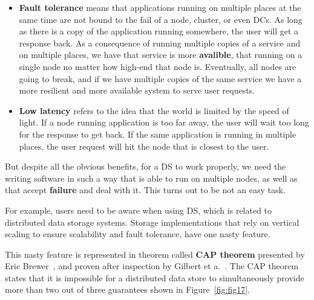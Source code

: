 \begin{itemize}
	\item \textbf{Fault tolerance} means that applications running on multiple places at the same time are not bound to the fail of a node, cluster, or even DCs. As long as there is a copy of the application running somewhere, the user will get a response back. As a consequence of running multiple copies of a service and on multiple places, we have that service is more \textbf{avalible}, that running on a single node no matter how high-end that node is. Eventually, all nodes are going to break, and if we have multiple copies of the same service we have a more resilient and more available system to serve user requests.
	\item \textbf{Low latency} refers to the idea that the world is limited by the speed of light. If a node running application is too far away, the user will wait too long for the response to get back. If the same application is running in multiple places, the user request will hit the node that is closest to the user.
\end{itemize}

But despite all the obvious benefits, for a DS to work properly, we need the writing software in such a way that is able to run on multiple nodes, as well as that accept \textbf{failure} and deal with it. This turns out to be not an easy task.

For example, users need to be aware when using DS, which is related to distributed data storage systems. Storage implementations that rely on vertical scaling to ensure scalability and fault tolerance, have one nasty feature. 

This nasty feature is represented in theorem called \textbf{CAP theorem} presented by Eric Brewer~\cite{Brewer2000}, and proven after inspection by Gilbert et a.~\cite{GilbertL02}. The CAP theorem states that it is impossible for a distributed data store to simultaneously provide more than two out of three guarantees shown in Figure~\ref{fig:fig17}.

